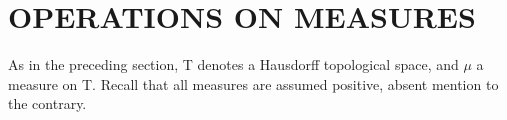 \section{OPERATIONS ON MEASURES}

As in the preceding section, T denotes a Hausdorff topological space, and \(\mu\) a measure on T. Recall that all measures are assumed positive, absent mention to the contrary.

